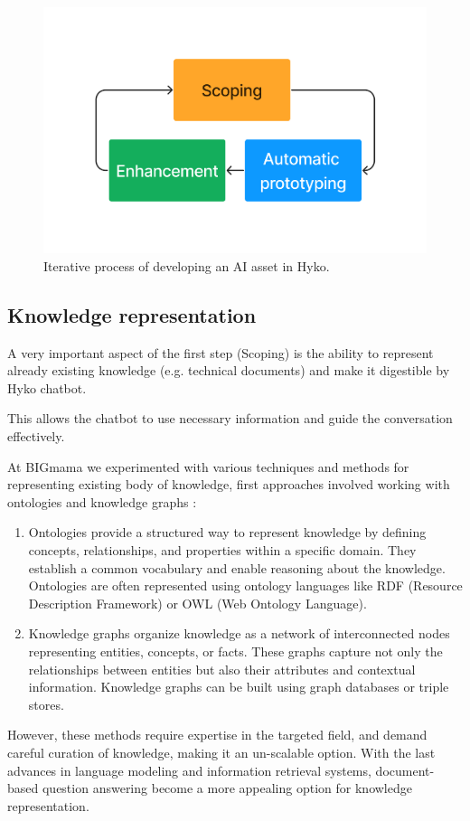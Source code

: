 \documentclass[a4paper,12pt]{article}
\begin{document}
\begin{figure}[h]
	\centering
	\includegraphics[width=.5\linewidth]{figures/3process.png}
	\caption{Iterative process of developing an AI asset in Hyko.}
	\label{fig:hykoprocess}
\end{figure}

\subsection{Knowledge representation}
A very important aspect of the first step (Scoping) is the ability to represent already existing knowledge (e.g. technical documents) 
and make it digestible by Hyko chatbot. 

This allows the chatbot to use necessary information and guide the conversation effectively.

At BIGmama we experimented with various techniques and methods for representing existing body of knowledge, 
first approaches involved working with ontologies and knowledge graphs :

\begin{enumerate}
	\item Ontologies provide a structured way to represent knowledge by defining concepts, relationships, and properties within a specific domain. They establish a common vocabulary and enable reasoning about the knowledge. 
	      Ontologies are often represented using ontology languages like RDF (Resource Description Framework) or OWL (Web Ontology Language).
	\item Knowledge graphs organize knowledge as a network of interconnected nodes representing entities, concepts, or facts. 
	      These graphs capture not only the relationships between entities but also their attributes and contextual information. Knowledge graphs can be built using graph databases or triple stores.
\end{enumerate}

However, these methods require expertise in the targeted field, and demand careful curation of knowledge, making it an un-scalable option. With the last advances in language modeling and information retrieval systems, 
document-based question answering become a more appealing option for knowledge representation.  
\end{document}
